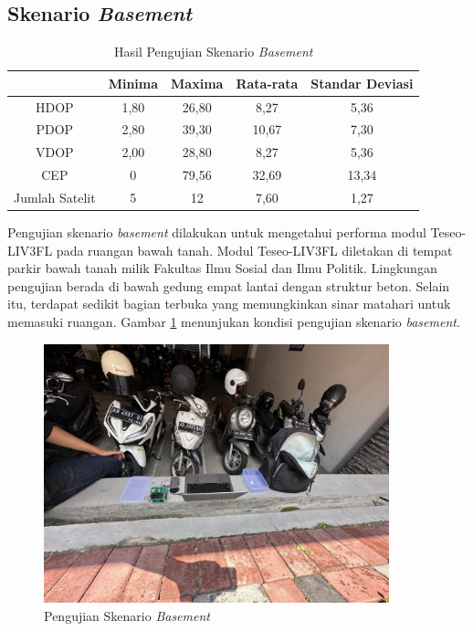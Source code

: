 \subsection{Skenario \textit{Basement}}
\begin{table}[H]
	\caption{Hasil Pengujian Skenario \textit{Basement}}
	\vspace{0.5em}
	\centering
	\begin{tabular}{ccccc}
		\hline
		& \textbf{Minima} & \textbf{Maxima} & \textbf{Rata-rata} & \textbf{Standar Deviasi}\\
		\hline 
		HDOP & 1,80 & 26,80 & 8,27 & 5,36\\
		PDOP & 2,80 & 39,30 & 10,67 & 7,30\\
		VDOP & 2,00 & 28,80 & 8,27 & 5,36\\
		CEP & 0 & 79,56 & 32,69 & 13,34\\
		Jumlah Satelit & 5 & 12 & 7,60 & 1,27\\
		\hline
	\end{tabular}
	\label{Tab: basement-table}
\end{table}

Pengujian skenario \textit{basement} dilakukan untuk mengetahui performa modul Teseo-LIV3FL pada ruangan bawah tanah. Modul Teseo-LIV3FL diletakan di tempat parkir bawah tanah milik Fakultas Ilmu Sosial dan Ilmu Politik. Lingkungan pengujian berada di bawah gedung empat lantai dengan struktur beton. Selain itu, terdapat sedikit bagian terbuka yang memungkinkan sinar matahari untuk memasuki ruangan. Gambar \ref{Fig: basement-keadaan} menunjukan kondisi pengujian skenario \textit{basement}.

\begin{figure}[H]
	\centering
	\includegraphics[width=10cm]{contents/chapter-4/1-skenario-basement/keadaan.jpg}
	\caption{Pengujian Skenario \textit{Basement}}
	\label{Fig: basement-keadaan}
\end{figure}

